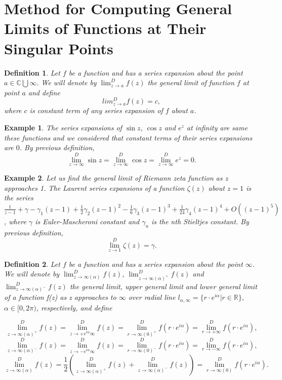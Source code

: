 \documentclass[12pt]{article}
\def\R{{\mathbb R}}
\def\Co{{\mathbb C}}
\newtheorem{de}{Definition}[section]
\newtheorem{ex}{Example}[section]
\begin{document}
\section{Method for Computing General Limits of Functions at Their Singular Points}
\label{section:meth}

\begin{de}
Let $f$ be a function and has a series expansion about the point $a \in \Co\bigcup\infty$. We will denote by $\lim_{z\to a}^D f(z)$ the general limit of function $f$ at point $a$ and define $$lim_{z\to a}^D f(z)=c,$$ where $c$ is constant term of any series expansion of $f$ about $a$.
\end{de}

\begin{ex}
The series expansions of $\sin z$, $\cos z$ and $e^z$ at infinity are same these functions and we considered that constant terms of their series expansions are $0$. By previous definition, $$\lim_{z\to \infty}^D \sin z=\lim_{z\to \infty}^D \cos z=\lim_{z\to \infty}^D e^z=0.$$
\end{ex}

\begin{ex}
Let us find the general limit of Riemann zeta function as z approaches 1.
The Laurent series expansions of a function $\zeta(z)$ about $z=1$ is the series $\frac{1}{z-1}+\gamma-\gamma _1(z-1)+\frac{1}{2}\gamma _2(z-1)^2-\frac{1}{6}\gamma_3(z-1)^3+\frac{1}{24}\gamma_4(z-1)^4+O((z-1)^5)$, where $\gamma$ is Euler-Mascheroni constant and $\gamma_n$ is the nth Stieltjes constant. By previous definition, $$\lim_{z\to 1}^D \zeta(z)=\gamma.$$
\end{ex}

\begin{de}
Let $f$ be a function and has a series expansion about the point $\infty$. We will denote by $\lim^D_{z\to\infty(\alpha)}f(z)$, $\lim^D_{z\to\infty(\alpha)^+}f(z)$ and $\lim^D_{z\to\infty(\alpha)^-}f(z)$ the general limit, upper general limit and lower general limit  of a function f(z) as z approaches to $\infty$ over radial line $l_{\alpha, \infty}=\{r\cdot e^{i\alpha}|r\in \R\}$, $\alpha\in[0,2\pi)$, respectively, and define

$$\lim^D_{z\to\infty(\alpha)^+}f(z)=\lim^D_{z\to+e^{i\alpha}\infty}f(z)=\lim^D_{r\to\infty(0)^+}f(r\cdot e^{i\alpha})=\lim^D_{r\to +\infty}f(r\cdot e^{i\alpha}),$$ 
$$\lim^D_{z\to\infty(\alpha)^-}f(z)=\lim^D_{z\to-e^{i\alpha}\infty}f(z)=\lim^D_{r\to\infty(0)^-}f(r\cdot e^{i\alpha})=\lim^D_{r\to -\infty}f(r\cdot e^{i\alpha}),$$
$$\lim^D_{z\to\infty(\alpha)}f(z)=\frac{1}{2}(\lim^D_{z\to\infty(\alpha)^+}f(z)+\lim^D_{z\to\infty(\alpha)^-}f(z))=\lim^D_{r\to\infty(0)}f(r\cdot e^{i\alpha}).$$
\end{de}
\end{document}
